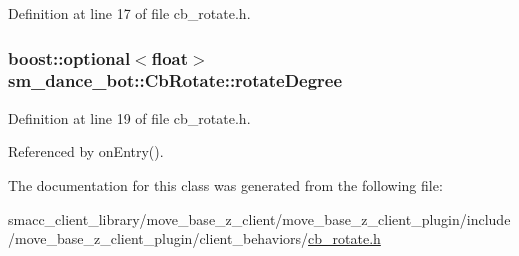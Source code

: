 Definition at line 17 of file cb\+\_\+rotate.\+h.

\subsubsection[{\texorpdfstring{rotate\+Degree}{rotateDegree}}]{\setlength{\rightskip}{0pt plus 5cm}boost\+::optional$<$float$>$ sm\+\_\+dance\+\_\+bot\+::\+Cb\+Rotate\+::rotate\+Degree}\hypertarget{classsm__dance__bot_1_1CbRotate_aede47d27b6caff0d5459afd1762ddda2}{}\label{classsm__dance__bot_1_1CbRotate_aede47d27b6caff0d5459afd1762ddda2}


Definition at line 19 of file cb\+\_\+rotate.\+h.



Referenced by on\+Entry().



The documentation for this class was generated from the following file\+:\begin{DoxyCompactItemize}
\item 
smacc\+\_\+client\+\_\+library/move\+\_\+base\+\_\+z\+\_\+client/move\+\_\+base\+\_\+z\+\_\+client\+\_\+plugin/include/move\+\_\+base\+\_\+z\+\_\+client\+\_\+plugin/client\+\_\+behaviors/\hyperlink{smacc__client__library_2move__base__z__client_2move__base__z__client__plugin_2include_2move__bas2ff277154dfb9bba8a39d43e74a5a16e}{cb\+\_\+rotate.\+h}\end{DoxyCompactItemize}
